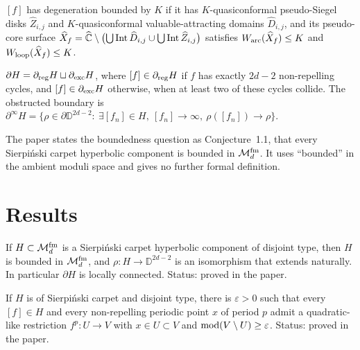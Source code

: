 \begin{definition}
\label{def:sierp-bounded-degeneration}
$[f]$ has degeneration bounded by $K$ if it has $K$-quasiconformal pseudo-Siegel disks $\widehat Z_{i,j}$ and
$K$-quasiconformal valuable-attracting domains $\widehat D_{i,j}$, and its pseudo-core surface
$\widehat X_f=\widehat{\mathbb C}\setminus\bigl(\bigcup\operatorname{Int}\widehat D_{i,j}\cup\bigcup\operatorname{Int}\widehat Z_{i,j}\bigr)$
satisfies $W_{\rm arc}(\widehat X_f)\le K$ and $W_{\rm loop}(\widehat X_f)\le K$.
\end{definition}

\begin{definition}
\label{def:sierp-boundary}
$\partial H=\partial_{\rm reg}H\sqcup\partial_{\rm exc}H$, where $[f]\in\partial_{\rm reg}H$ if $f$ has exactly $2d-2$
non-repelling cycles, and $[f]\in\partial_{\rm exc}H$ otherwise, when at least two of these cycles collide.  The
obstructed boundary is $\partial^\infty H=\{\rho\in\partial\mathbb D^{2d-2}:\ \exists[f_n]\in H,\ [f_n]\to\infty,\ \rho([f_n])\to\rho\}$.
\end{definition}

\begin{remark}
The paper states the boundedness question as Conjecture~1.1, that every Sierpi\'nski carpet hyperbolic
component is bounded in $\mathcal M^{\rm fm}_d$.  It uses ``bounded'' in the ambient moduli space and gives no further
formal definition.
\end{remark}

\section{Results}
\label{sec:digest-sierpinski-results}

\begin{theorem}
\label{thm:sierp-A}
If $H\subset\mathcal M^{\rm fm}_d$ is a Sierpi\'nski carpet hyperbolic component of disjoint type, then $H$ is bounded in
$\mathcal M^{\rm fm}_d$, and $\rho\colon H\to\mathbb D^{2d-2}$ is an isomorphism that extends naturally.  In particular
$\partial H$ is locally connected.  Status: proved in the paper.
\end{theorem}

\begin{theorem}
\label{thm:sierp-B}
If $H$ is of Sierpi\'nski carpet and disjoint type, there is $\varepsilon>0$ such that every $[f]\in H$ and every non-repelling
periodic point $x$ of period $p$ admit a quadratic-like restriction $f^p\colon U\to V$ with $x\in U\subset V$ and
$\operatorname{mod}(V\setminus U)\ge\varepsilon$.  Status: proved in the paper.
\end{theorem}

